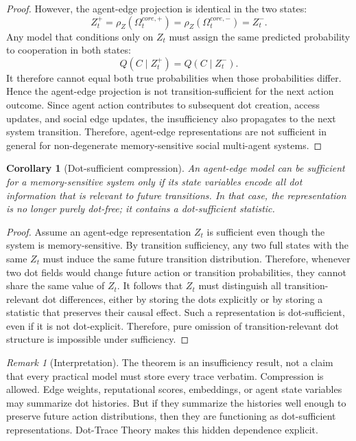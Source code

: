 \documentclass[11pt]{article}
\newtheorem{corollary}{Corollary}
\theoremstyle{remark}
\newtheorem{remark}{Remark}
\begin{document}
\begin{proof}
However, the agent-edge projection is identical in the two states:
$$
Z_t^+=\rho_Z(\Omega_t^{core,+})=\rho_Z(\Omega_t^{core,-})=Z_t^-.
$$
Any model that conditions only on $Z_t$ must assign the same predicted probability to cooperation in both states:
$$
Q(C\mid Z_t^+)=Q(C\mid Z_t^-).
$$
It therefore cannot equal both true probabilities when those probabilities differ. Hence the agent-edge projection is not transition-sufficient for the next action outcome. Since agent action contributes to subsequent dot creation, access updates, and social edge updates, the insufficiency also propagates to the next system transition. Therefore, agent-edge representations are not sufficient in general for non-degenerate memory-sensitive social multi-agent systems.
\end{proof}

\begin{corollary}[Dot-sufficient compression]
An agent-edge model can be sufficient for a memory-sensitive system only if its state variables encode all dot information that is relevant to future transitions. In that case, the representation is no longer purely dot-free; it contains a dot-sufficient statistic.
\end{corollary}

\begin{proof}
Assume an agent-edge representation $Z_t$ is sufficient even though the system is memory-sensitive. By transition sufficiency, any two full states with the same $Z_t$ must induce the same future transition distribution. Therefore, whenever two dot fields would change future action or transition probabilities, they cannot share the same value of $Z_t$. It follows that $Z_t$ must distinguish all transition-relevant dot differences, either by storing the dots explicitly or by storing a statistic that preserves their causal effect. Such a representation is dot-sufficient, even if it is not dot-explicit. Therefore, pure omission of transition-relevant dot structure is impossible under sufficiency.
\end{proof}

\begin{remark}[Interpretation]
The theorem is an insufficiency result, not a claim that every practical model must store every trace verbatim. Compression is allowed. Edge weights, reputational scores, embeddings, or agent state variables may summarize dot histories. But if they summarize the histories well enough to preserve future action distributions, then they are functioning as dot-sufficient representations. Dot-Trace Theory makes this hidden dependence explicit.
\end{remark}
\end{document}
